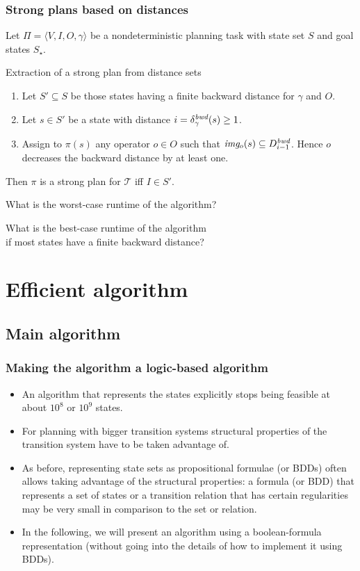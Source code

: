 \documentclass{gkibeamer}
\begin{document}
\begin{frame}
  \frametitle{Strong plans based on distances}

  Let $\Pi = \langle V, I, O, \gamma\rangle$ be a nondeterministic
  planning task with state set $S$ and goal states $S_\star$.

  \begin{block}{Extraction of a strong plan from distance sets}
    \begin{enumerate}
    \item Let $S' \subseteq S$ be those states having a finite backward
      distance for $\gamma$ and $O$.
    \item Let $s \in S'$ be a state with distance $i = \disbwd{\gamma}{s} \ge 1$.
    \item Assign to $\pi(s)$ any operator $o \in O$ such that
      $\image{o}{s} \subseteq D^{\ms{bwd}}_{i-1}$. 
      Hence $o$ decreases the backward distance by at least one.
    \end{enumerate}
    Then $\pi$ is a strong plan for $\mathcal T$ iff
    $I \in S'$.
  \end{block}

   What is the \alert{worst-case} runtime of the
  algorithm?

   What is the \alert{best-case} runtime of the
  algorithm \\
   if most states have a finite backward distance?
\end{frame}

\section{Efficient algorithm}

\subsection{Main algorithm}

\begin{frame}
  \frametitle{Making the algorithm a logic-based algorithm}

  \begin{itemize}
  \item An algorithm that represents the states \alert{explicitly}
    stops being feasible at about $10^8$ or $10^9$ states.
  \item For planning with bigger transition systems \alert{structural
      properties} of the transition system have to be taken advantage
    of.
  \item As before, representing state sets as \alert{propositional
      formulae} (or \alert{BDDs}) often allows taking advantage of the
    structural properties: a formula (or BDD) that represents a set of
    states or a transition relation that has certain regularities may
    be very small in comparison to the set or relation.
  \item In the following, we will present an algorithm using a
    boolean-formula representation (without going into the details of
    how to implement it using BDDs).
  \end{itemize}
\end{frame}
\end{document}
